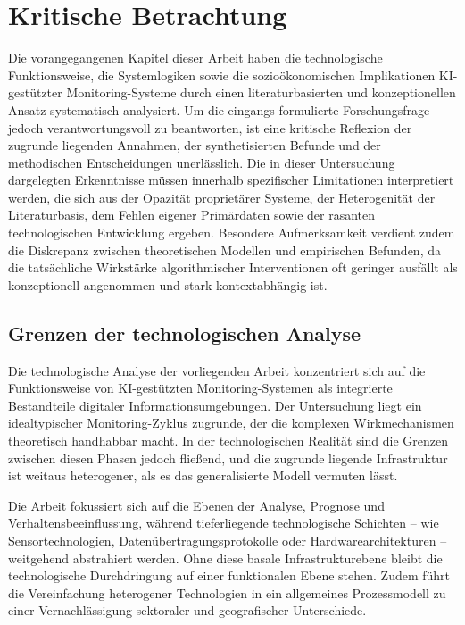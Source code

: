 \chapter{Kritische Betrachtung}

Die vorangegangenen Kapitel dieser Arbeit haben die technologische Funktionsweise, die Systemlogiken sowie die sozioökonomischen Implikationen \ac{KI}-gestützter Monitoring-Systeme durch einen literaturbasierten und konzeptionellen Ansatz systematisch analysiert. Um die eingangs formulierte Forschungsfrage jedoch verantwortungsvoll zu beantworten, ist eine kritische Reflexion der zugrunde liegenden Annahmen, der synthetisierten Befunde und der methodischen Entscheidungen unerlässlich. Die in dieser Untersuchung dargelegten Erkenntnisse müssen innerhalb spezifischer Limitationen interpretiert werden, die sich aus der Opazität proprietärer Systeme, der Heterogenität der Literaturbasis, dem Fehlen eigener Primärdaten sowie der rasanten technologischen Entwicklung ergeben. Besondere Aufmerksamkeit verdient zudem die Diskrepanz zwischen theoretischen Modellen und empirischen Befunden, da die tatsächliche Wirkstärke algorithmischer Interventionen oft geringer ausfällt als konzeptionell angenommen und stark kontextabhängig ist.

\section{Grenzen der technologischen Analyse}

Die technologische Analyse der vorliegenden Arbeit konzentriert sich auf die Funktionsweise von \ac{KI}-gestützten Monitoring-Systemen als integrierte Bestandteile digitaler Informationsumgebungen. Der Untersuchung liegt ein idealtypischer Monitoring-Zyklus zugrunde, der die komplexen Wirkmechanismen theoretisch handhabbar macht. In der technologischen Realität sind die Grenzen zwischen diesen Phasen jedoch fließend, und die zugrunde liegende Infrastruktur ist weitaus heterogener, als es das generalisierte Modell vermuten lässt.

Die Arbeit fokussiert sich auf die Ebenen der Analyse, Prognose und Verhaltensbeeinflussung, während tieferliegende technologische Schichten -- wie Sensortechnologien, Datenübertragungsprotokolle oder Hardwarearchitekturen -- weitgehend abstrahiert werden. Ohne diese basale Infrastrukturebene bleibt die technologische Durchdringung auf einer funktionalen Ebene stehen. Zudem führt die Vereinfachung heterogener Technologien in ein allgemeines Prozessmodell zu einer Vernachlässigung sektoraler und geografischer Unterschiede.

